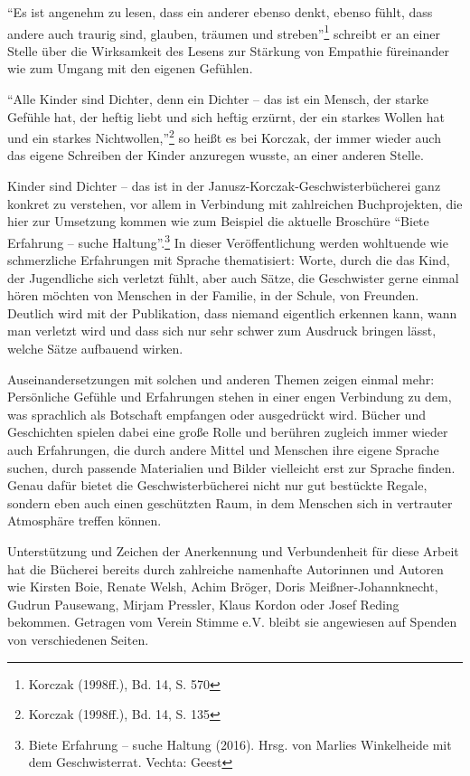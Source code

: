 \documentclass[a4paper,
fontsize=11pt,
oneside,
numbers=noperiodatend,
parskip=half-,
bibliography=totoc,
final
]{scrartcl}
\begin{document}
\enquote{Es ist angenehm zu lesen, dass ein anderer ebenso denkt, ebenso
fühlt, dass andere auch traurig sind, glauben, träumen und
streben}\footnote{Korczak (1998ff.), Bd. 14, S. 570} schreibt er an
einer Stelle über die Wirksamkeit des Lesens zur Stärkung von Empathie
füreinander wie zum Umgang mit den eigenen Gefühlen.

\enquote{Alle Kinder sind Dichter, denn ein Dichter -- das ist ein
Mensch, der starke Gefühle hat, der heftig liebt und sich heftig
erzürnt, der ein starkes Wollen hat und ein starkes
Nichtwollen,}\footnote{Korczak (1998ff.), Bd. 14, S. 135} so heißt es
bei Korczak, der immer wieder auch das eigene Schreiben der Kinder
anzuregen wusste, an einer anderen Stelle.

Kinder sind Dichter -- das ist in der Janusz-Korczak-Geschwisterbücherei
ganz konkret zu verstehen, vor allem in Verbindung mit zahlreichen
Buchprojekten, die hier zur Umsetzung kommen wie zum Beispiel die
aktuelle Broschüre \enquote{Biete Erfahrung -- suche Haltung}.\footnote{Biete
  Erfahrung -- suche Haltung (2016). Hrsg. von Marlies Winkelheide mit
  dem Geschwisterrat. Vechta: Geest} In dieser Veröffentlichung werden
wohltuende wie schmerzliche Erfahrungen mit Sprache thematisiert: Worte,
durch die das Kind, der Jugendliche sich verletzt fühlt, aber auch
Sätze, die Geschwister gerne einmal hören möchten von Menschen in der
Familie, in der Schule, von Freunden.\\
Deutlich wird mit der Publikation, dass niemand eigentlich erkennen
kann, wann man verletzt wird und dass sich nur sehr schwer zum Ausdruck
bringen lässt, welche Sätze aufbauend wirken.

Auseinandersetzungen mit solchen und anderen Themen zeigen einmal mehr:
Persönliche Gefühle und Erfahrungen stehen in einer engen Verbindung zu
dem, was sprachlich als Botschaft empfangen oder ausgedrückt wird.
Bücher und Geschichten spielen dabei eine große Rolle und berühren
zugleich immer wieder auch Erfahrungen, die durch andere Mittel und
Menschen ihre eigene Sprache suchen, durch passende Materialien und
Bilder vielleicht erst zur Sprache finden. Genau dafür bietet die
Geschwisterbücherei nicht nur gut bestückte Regale, sondern eben auch
einen geschützten Raum, in dem Menschen sich in vertrauter Atmosphäre
treffen können.

Unterstützung und Zeichen der Anerkennung und Verbundenheit für diese
Arbeit hat die Bücherei bereits durch zahlreiche namenhafte Autorinnen
und Autoren wie Kirsten Boie, Renate Welsh, Achim Bröger, Doris
Meißner-Johannknecht, Gudrun Pausewang, Mirjam Pressler, Klaus Kordon
oder Josef Reding bekommen. Getragen vom Verein Stimme e.V. bleibt sie
angewiesen auf Spenden von verschiedenen Seiten.
\end{document}
